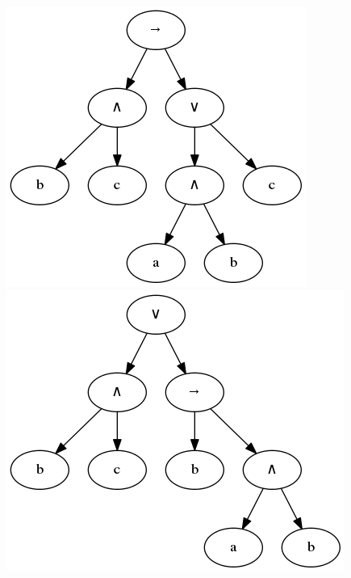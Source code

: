 \documentclass[12pt,fleqn]{article}
\begin{document}
\FloatBarrier

\begin{figure}[!h]%
  \centering
  \begin{minipage}{1.5in}%
    \centering
    \includegraphics[scale=0.3]{t3.png}
  \end{minipage}%
  \qquad
  \begin{minipage}{1.5in}%
    \centering
    \includegraphics[scale=0.3]{t4.png}
  \end{minipage}%
  \qquad
  \begin{minipage}{1.5in}%
    \centering

\end{minipage}
\end{figure}
\end{document}
